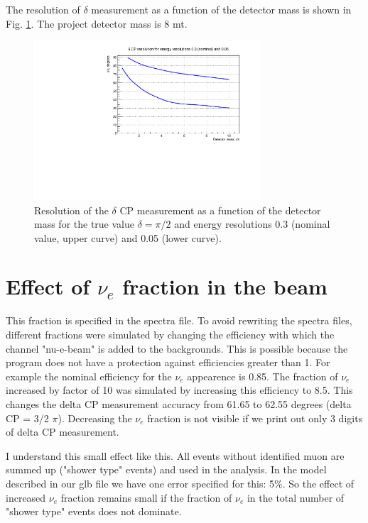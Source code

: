 \documentclass[prd,showpacs,groupedaddress,superscriptaddress,amsmath,amssymb]{revtex4-2} %
\begin{document}
 The resolution of $\delta$ measurement as a function of the detector mass is shown in Fig. \ref{fig:del_delres_mdet}. The project detector mass is 8 mt.

\begin{figure}[h]
\begin{center}
\includegraphics[width=0.75\textwidth]{del_delres_mdet.pdf}
\caption {Resolution of the $\delta$ CP measurement as a function of the detector mass for the true value $\delta = \pi/2$
and energy resolutions 0.3 (nominal value, upper curve) and 0.05 (lower curve).
\label{fig:del_delres_mdet}}
\end{center}  
\end{figure}


\section{Effect of $\nu_e$ fraction in the beam}


This fraction is specified in the spectra file. To avoid rewriting the spectra files, different fractions were simulated by changing the efficiency
with which the channel "nu-e-beam" is added to the backgrounds. This is possible because the program does not have a protection against efficiencies
greater than 1. For example the nominal efficiency for the $\nu_e$ appearence is 0.85. The fraction of $\nu_e$ increased by factor of 10 was
simulated by increasing this efficiency to 8.5. This changes the delta CP measurement accuracy from 61.65 to 62.55 degrees (delta CP = 3/2 $\pi$).
Decreasing the $\nu_e$ fraction is not visible if we print out only 3 digits of delta CP measurement.

I understand this small effect like this. All events without identified muon are summed up ("shower type" events) and used in the analysis. In the model
described in our glb file we have one error specified for this: 5\%. So the effect of increased $\nu_e$ fraction remains small if the fraction of $\nu_e$
in the total number of "shower type" events does not dominate.
\end{document}
